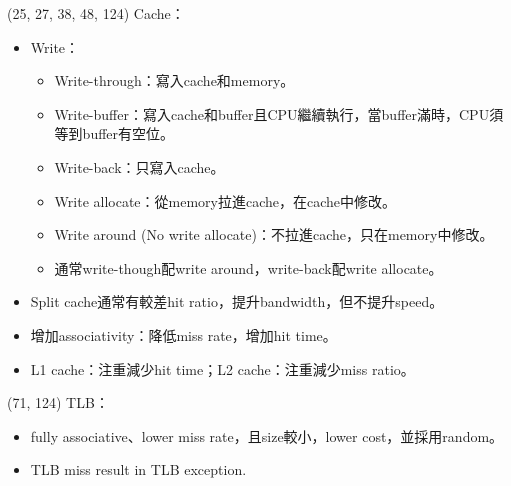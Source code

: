 \item \begin{theorem}{(25, 27, 38, 48, 124)} Cache：\begin{itemize}
        \item Write：\begin{itemize}
            \item Write-through：寫入cache和memory。
            \item Write-buffer：寫入cache和buffer且CPU繼續執行，當buffer滿時，CPU須等到buffer有空位。
            \item Write-back：只寫入cache。
            \item Write allocate：從memory拉進cache，在cache中修改。
            \item Write around (No write allocate)：不拉進cache，只在memory中修改。
            \item 通常write-though配write around，write-back配write allocate。
        \end{itemize}
        \item Split cache通常有較差hit ratio，提升bandwidth，但不提升speed。
        \item 增加associativity：降低miss rate，增加hit time。
        \item L1 cache：注重減少hit time；L2 cache：注重減少miss ratio。
    \end{itemize}
\end{theorem}

\item \begin{theorem}{(71, 124)} TLB：\begin{itemize}
        \item fully associative、lower miss rate，且size較小，lower cost，並採用random。
        \item TLB miss result in TLB exception.
    \end{itemize}
\end{theorem}
